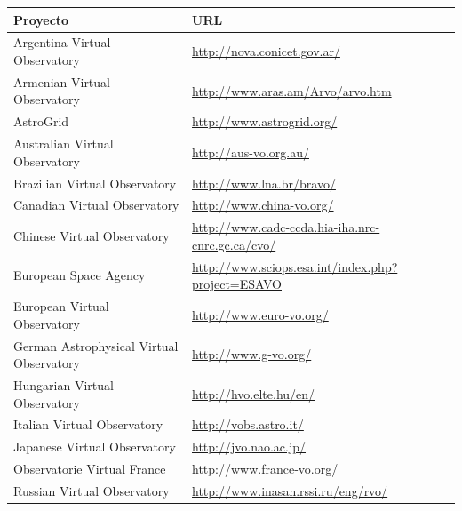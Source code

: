 \documentclass[11pt]{article}
\begin{document}
             \begin{center}
                 \begin{tabular}{|p{7cm} | p{7cm}|}
                     \hline
                     \textbf{Proyecto} & \textbf{URL} \\
                     \hline
                     Argentina Virtual Observatory &
\url{http://nova.conicet.gov.ar/} \\
                     \hline
                     Armenian Virtual Observatory &
\url{http://www.aras.am/Arvo/arvo.htm} \\
                     \hline
                     AstroGrid & \url{http://www.astrogrid.org/} \\
                     \hline
                     Australian Virtual Observatory &
\url{http://aus-vo.org.au/} \\
                     \hline
                     Brazilian Virtual Observatory &
\url{http://www.lna.br/bravo/} \\
                     \hline
                     Canadian Virtual Observatory &
\url{http://www.china-vo.org/} \\
                     \hline
                     Chinese Virtual Observatory &
\url{http://www.cadc-ccda.hia-iha.nrc-cnrc.gc.ca/cvo/} \\
                     \hline
                     European Space Agency &
\url{http://www.sciops.esa.int/index.php?project=ESAVO} \\
                     \hline
                     European Virtual Observatory &
\url{http://www.euro-vo.org/} \\
                     \hline
                     German Astrophysical Virtual Observatory &
\url{http://www.g-vo.org/} \\
                     \hline
                     Hungarian Virtual Observatory &
\url{http://hvo.elte.hu/en/} \\
                     \hline
                     Italian Virtual Observatory & \url{http://vobs.astro.it/}
\\
                     \hline
                     Japanese Virtual Observatory & \url{http://jvo.nao.ac.jp/}
\\
                     \hline
                     Observatorie Virtual France &
\url{http://www.france-vo.org/} \\
                     \hline
                     Russian Virtual Observatory &
\url{http://www.inasan.rssi.ru/eng/rvo/} \\

\end{tabular}
\end{center}
\end{document}
